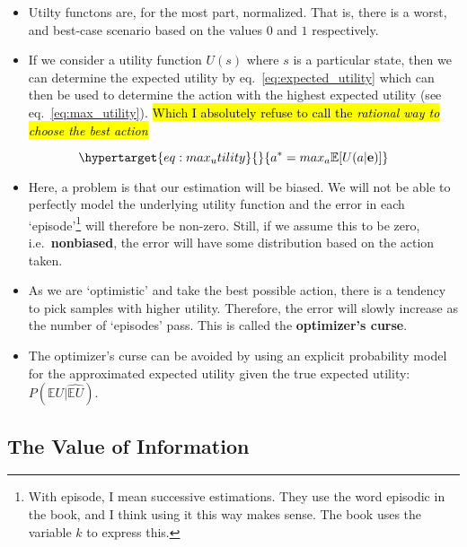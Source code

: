 \documentclass[
]{book}
\providecommand{\tightlist}{%
  \setlength{\itemsep}{0pt}\setlength{\parskip}{0pt}}
\begin{document}
\begin{itemize}
\tightlist
\item
  Utilty functons are, for the most part, normalized. That is, there is
  a worst, and best-case scenario based on the values \(0\) and \(1\)
  respectively.
\item
  If we consider a utility function \(U(s)\) where \(s\) is a particular
  state, then we can determine the expected utility by
  eq.~\ref{eq:expected_utility} which can then be used to determine the
  action with the highest expected utility (see
  eq.~\ref{eq:max_utility}). \hl{Which I absolutely refuse to call the
  \emph{rational way to choose the best action}}
\end{itemize}

\begin{equation}\protect\hypertarget{eq:max_utility}{}{
a^* = max_a \mathbb{E}[U(a|\mathbf{e})]
}\label{eq:max_utility}\end{equation}

\begin{itemize}
\tightlist
\item
  Here, a problem is that our estimation will be biased. We will not be
  able to perfectly model the underlying utility function and the error
  in each `episode'\footnote{With episode, I mean successive
    estimations. They use the word episodic in the book, and I think
    using it this way makes sense. The book uses the variable \(k\) to
    express this.} will therefore be non-zero. Still, if we assume this
  to be zero, i.e.~\textbf{nonbiased}, the error will have some
  distribution based on the action taken.
\item
  As we are `optimistic' and take the best possible action, there is a
  tendency to pick samples with higher utility. Therefore, the error
  will slowly increase as the number of `episodes' pass. This is called
  the \textbf{optimizer's curse}.
\item
  The optimizer's curse can be avoided by using an explicit probability
  model for the approximated expected utility given the true expected
  utility: \(P( \mathbb{E}U | \widehat{\mathbb{E}U} )\).
\end{itemize}

\hypertarget{the-value-of-information}{%
\subsection{The Value of Information}\label{the-value-of-information}}
\end{document}
